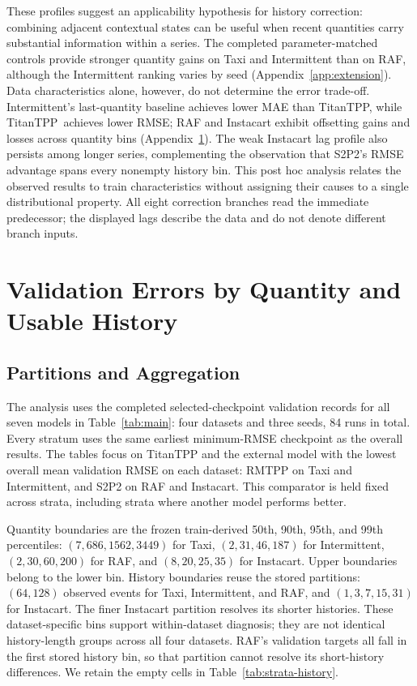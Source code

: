 \documentclass[runningheads]{llncs}
\newcommand{\method}{TitanTPP}
\begin{document}
These profiles suggest an applicability hypothesis for history correction:
combining adjacent contextual states can be useful when recent quantities
carry substantial information within a series. The completed
parameter-matched controls provide stronger quantity gains on Taxi and
Intermittent than on RAF, although the Intermittent ranking varies by seed
(Appendix~\ref{app:extension}). Data characteristics alone, however, do
not determine the error trade-off. Intermittent's last-quantity baseline
achieves lower MAE than \method, while \method\ achieves lower RMSE;
RAF and Instacart exhibit offsetting gains and losses across quantity bins
(Appendix~\ref{app:strata}). The weak Instacart lag profile also persists
among longer series, complementing the observation that S2P2's RMSE
advantage spans every nonempty history bin. This post hoc analysis relates
the observed results to train characteristics without assigning their
causes to a single distributional property. All eight correction branches
read the immediate predecessor; the displayed lags describe the data and
do not denote different branch inputs.

\section{Validation Errors by Quantity and Usable History}\label{app:strata}
\subsection{Partitions and Aggregation}
The analysis uses the completed selected-checkpoint validation records for
all seven models in Table~\ref{tab:main}: four datasets and three seeds,
84 runs in total. Every stratum uses the same earliest minimum-RMSE
checkpoint as the overall results. The tables focus on TitanTPP and the
external model with the lowest overall mean validation RMSE on each dataset:
RMTPP on Taxi and Intermittent, and S2P2 on RAF and Instacart. This comparator
is held fixed across strata, including strata where another model performs
better.

Quantity boundaries are the frozen train-derived 50th, 90th, 95th, and
99th percentiles: $(7,686,1562,3449)$ for Taxi, $(2,31,46,187)$ for
Intermittent, $(2,30,60,200)$ for RAF, and $(8,20,25,35)$ for Instacart.
Upper boundaries belong to the lower bin. History boundaries reuse the
stored partitions: $(64,128)$ observed events for Taxi, Intermittent, and
RAF, and $(1,3,7,15,31)$ for Instacart. The finer Instacart partition
resolves its shorter histories. These dataset-specific bins support
within-dataset diagnosis; they are not identical history-length groups
across all four datasets. RAF's validation targets all fall in the first
stored history bin, so that partition cannot resolve its short-history
differences. We retain the empty cells in Table~\ref{tab:strata-history}.
\end{document}
